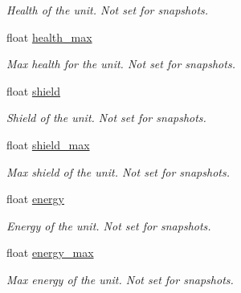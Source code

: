 \begin{DoxyCompactItemize}
\begin{DoxyCompactList}\small\item\em Health of the unit. Not set for snapshots. \end{DoxyCompactList}\item 
\mbox{\label{classsc2_1_1_unit_a9903ceca120d82cacc49dee00150fe67}} 
float \hyperlink{classsc2_1_1_unit_a9903ceca120d82cacc49dee00150fe67}{health\+\_\+max}
\begin{DoxyCompactList}\small\item\em Max health for the unit. Not set for snapshots. \end{DoxyCompactList}\item 
\mbox{\label{classsc2_1_1_unit_ae5ee0c4d31a1266e31ac0a739bcc3d86}} 
float \hyperlink{classsc2_1_1_unit_ae5ee0c4d31a1266e31ac0a739bcc3d86}{shield}
\begin{DoxyCompactList}\small\item\em Shield of the unit. Not set for snapshots. \end{DoxyCompactList}\item 
\mbox{\label{classsc2_1_1_unit_aaf79ea67a982c7d858abb0190cc0ac5c}} 
float \hyperlink{classsc2_1_1_unit_aaf79ea67a982c7d858abb0190cc0ac5c}{shield\+\_\+max}
\begin{DoxyCompactList}\small\item\em Max shield of the unit. Not set for snapshots. \end{DoxyCompactList}\item 
\mbox{\label{classsc2_1_1_unit_aa2b194b8a5499b7591356dc6365c0cdc}} 
float \hyperlink{classsc2_1_1_unit_aa2b194b8a5499b7591356dc6365c0cdc}{energy}
\begin{DoxyCompactList}\small\item\em Energy of the unit. Not set for snapshots. \end{DoxyCompactList}\item 
\mbox{\label{classsc2_1_1_unit_a746011af49f363075e4c595c384933ff}} 
float \hyperlink{classsc2_1_1_unit_a746011af49f363075e4c595c384933ff}{energy\+\_\+max}
\begin{DoxyCompactList}\small\item\em Max energy of the unit. Not set for snapshots. \end{DoxyCompactList}\item 

\end{DoxyCompactItemize}

